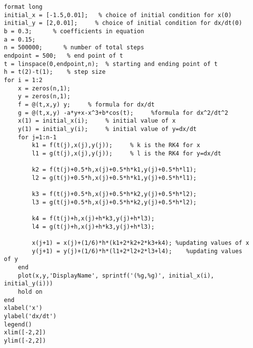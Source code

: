 \lstset{basicstyle=\footnotesize,style=myCustomMatlabStyle}
\begin{lstlisting}
format long
initial_x = [-1.5,0.01];   % choice of initial condition for x(0)
initial_y = [2,0.01];     % choice of initial condition for dx/dt(0)
b = 0.3;      % coefficients in equation
a = 0.15;
n = 500000;      % number of total steps
endpoint = 500;   % end point of t 
t = linspace(0,endpoint,n);  % starting and ending point of t
h = t(2)-t(1);    % step size
for i = 1:2
    x = zeros(n,1);
    y = zeros(n,1);
    f = @(t,x,y) y;     % formula for dx/dt
    g = @(t,x,y) -a*y+x-x^3+b*cos(t);     %formula for dx^2/dt^2
    x(1) = initial_x(i);     % initial value of x
    y(1) = initial_y(i);     % initial value of y=dx/dt
    for j=1:n-1
        k1 = f(t(j),x(j),y(j));     % k is the RK4 for x
        l1 = g(t(j),x(j),y(j));     % l is the RK4 for y=dx/dt

        k2 = f(t(j)+0.5*h,x(j)+0.5*h*k1,y(j)+0.5*h*l1);
        l2 = g(t(j)+0.5*h,x(j)+0.5*h*k1,y(j)+0.5*h*l1);

        k3 = f(t(j)+0.5*h,x(j)+0.5*h*k2,y(j)+0.5*h*l2);
        l3 = g(t(j)+0.5*h,x(j)+0.5*h*k2,y(j)+0.5*h*l2);

        k4 = f(t(j)+h,x(j)+h*k3,y(j)+h*l3);
        l4 = g(t(j)+h,x(j)+h*k3,y(j)+h*l3);

        x(j+1) = x(j)+(1/6)*h*(k1+2*k2+2*k3+k4); %updating values of x
        y(j+1) = y(j)+(1/6)*h*(l1+2*l2+2*l3+l4);    %updating values of y
    end
    plot(x,y,'DisplayName', sprintf('(%g,%g)', initial_x(i), initial_y(i)))
    hold on
end
xlabel('x')
ylabel('dx/dt')
legend()
xlim([-2,2])
ylim([-2,2])
\end{lstlisting}